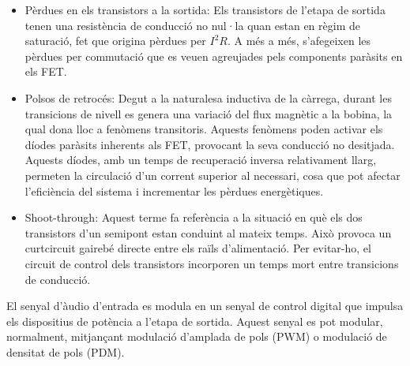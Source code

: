\begin{itemize}
	
	\item Pèrdues en els transistors a la sortida: Els transistors de l'etapa de sortida tenen una resistència de conducció no nul·la quan estan en règim de saturació, fet que origina pèrdues per $I^{2}R$. A més a més, s'afegeixen les pèrdues per commutació que es veuen agreujades pels components paràsits en els FET.
	
	\item Polsos de retrocés: Degut a la naturalesa inductiva de la càrrega, durant les transicions de nivell es genera una variació del flux magnètic a la bobina, la qual dona lloc a fenòmens transitoris. Aquests fenòmens poden activar els díodes paràsits inherents als FET, provocant la seva conducció no desitjada. Aquests díodes, amb un temps de recuperació inversa relativament llarg, permeten la circulació d’un corrent superior al necessari, cosa que pot afectar l’eficiència del sistema i incrementar les pèrdues energètiques.
	
	\item Shoot-through: Aquest terme fa referència a la situació en què els dos transistors d'un semipont estan conduint al mateix temps. Això provoca un curtcircuit gairebé directe entre els raïls d’alimentació. Per evitar-ho, el circuit de control dels transistors incorporen un temps mort entre transicions de conducció.
	
\end{itemize}

\par El senyal d'àudio d'entrada es modula en un senyal de control digital que impulsa els dispositius de potència a l'etapa de sortida. Aquest senyal es pot modular, normalment, mitjançant modulació d'amplada de pols (PWM) o modulació de densitat de pols (PDM).

